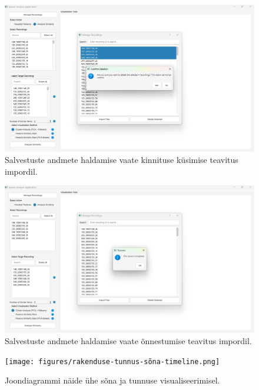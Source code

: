 \begin{figure}[H]
    \centering
    \includegraphics[width=\textwidth]{figures/rakenduse-teavitus-confirm.png}
    \captionsetup{list=no}
    \caption{Salvestuste andmete haldamise vaate kinnituse küsimise teavitus impordil.}
    \label{fig:rakenduse-teavitus-confirm}
\end{figure}

\begin{figure}[H]
    \centering
    \includegraphics[width=\textwidth]{figures/rakenduse-teavitus-import-complete.png}
    \captionsetup{list=no}
    \caption{Salvestuste andmete haldamise vaate õnnestumise teavitus impordil.}
    \label{fig:rakenduse-teavitus-confirm}
\end{figure}


\begin{figure}[H]
    \centering
    \texttt{[image: figures/rakenduse-tunnus-sõna-timeline.png]}
    \captionsetup{list=no}
    \caption{Joondiagrammi näide ühe sõna ja tunnuse visualiseerimisel.}
    \label{fig:rakenduse-tunnus-sõna-timeline}
\end{figure}

